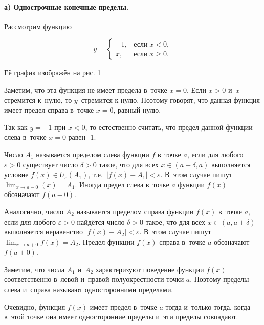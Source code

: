 
\paragraph{а) Однострочные конечные пределы.}\label{sec:4_1_3_a}
Рассмотрим функцию

\begin{equation*}
y = 
\begin{cases}
-1, & \text{если} \; x < 0, \\
x,  & \text{если} \; x \geqslant 0.
\end{cases}
\end{equation*}

\noindent
Её график изображён на рис. \ref{fig:4_1_3_4}

\begin{figure}\label{fig:4_1_3_4}
\end{figure}

\noindent
Заметим, что эта функция не имеет предела в~точке $x = 0$. Если $x > 0$ и~$x$
стремится к~нулю, то $y$~стремится к нулю. Поэтому говорят, что данная функция
имеет предел справа в~точке $x = 0$, равный нулю.

Так как $y = -1$ при $x < 0$, то естественно считать, что предел данной функции
слева в~точке $x = 0$ равен -1.

Число $A_{1}$ называется пределом слева функции $f$ в~точке $a$, если для любого
$\varepsilon > 0$ существует число $\delta > 0$ такое, что для всех
$x \in (a - \delta, a)$ выполняется условие $f(x) \in U_{\varepsilon}(A_{1})$,
т.е.\ $\left| f(x) - A_{1}\right| < \varepsilon$.
В~этом случае пишут $\displaystyle \lim_{x \to a-0}(x) = A_{1}$.
Иногда предел слева в~точке $a$ функции $f(x)$ обозначают $f(a - 0)$.

Аналогично, число $A_{2}$ называется пределом справа функции $f(x)$
в~точке $a$, если для любого $\varepsilon > 0$ найдётся число $\delta > 0$
такое, что для всех $x \in (a, a + \delta)$ выполняется неравенство
$\left| f(x) - A_{2}\right| < \varepsilon$.
В~этом случае пишут $\displaystyle \lim_{x \to a+0} f(x) = A_{2}$.
Предел функции $f(x)$ справа в~точке $a$ обозначают $f(a+0)$.

Заметим, что числа $A_{1}$ и~$A_{2}$ характеризуют поведение функции $f(x)$
соответственно в~левой и~правой полуокрестности точки $a$.
Поэтому пределы слева и~справа называют односторонними пределами.

Очевидно, функция $f(x)$ имеет предел в~точке $a$ тогда и~только тогда,
когда в~этой точке она имеет односторонние пределы и~эти пределы совпадают. 

